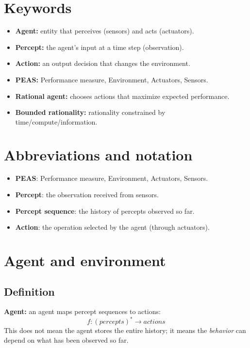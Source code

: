 \documentclass[11pt]{article}
\begin{document}
\section{Keywords}
\begin{itemize}[leftmargin=*]
  \item \textbf{Agent:} entity that perceives (sensors) and acts (actuators).
  \item \textbf{Percept:} the agent's input at a time step (observation).
  \item \textbf{Action:} an output decision that changes the environment.
  \item \textbf{PEAS:} Performance measure, Environment, Actuators, Sensors.
  \item \textbf{Rational agent:} chooses actions that maximize expected performance.
  \item \textbf{Bounded rationality:} rationality constrained by time/compute/information.
\end{itemize}

\section{Abbreviations and notation}
\begin{itemize}[leftmargin=*]
  \item \textbf{PEAS}: Performance measure, Environment, Actuators, Sensors.
  \item \textbf{Percept}: the observation received from sensors.
  \item \textbf{Percept sequence}: the history of percepts observed so far.
  \item \textbf{Action}: the operation selected by the agent (through actuators).
\end{itemize}

\section{Agent and environment}
\subsection{Definition}
\textbf{Agent:} an agent maps percept sequences to actions:
\[
  f : (percepts)^* \rightarrow actions
\]
This does not mean the agent stores the entire history; it means the \emph{behavior} can depend on what has been observed so far.
\end{document}
